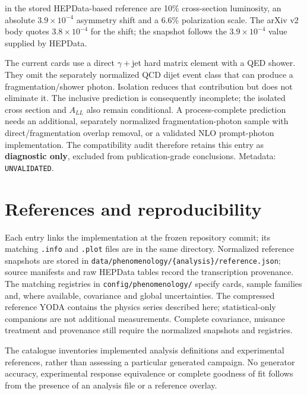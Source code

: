 \documentclass[11pt,a4paper]{article}
\begin{document}
\begin{description}
in the stored HEPData-based reference are 10\% cross-section luminosity,
an absolute $3.9\times10^{-4}$ asymmetry shift and a 6.6\% polarization scale.
The arXiv v2 body quotes $3.8\times10^{-4}$ for the shift; the snapshot follows
the $3.9\times10^{-4}$ value supplied by HEPData.
\item[Coverage and limitations.]
The current cards use a direct $\gamma+$jet hard matrix element with a QED
shower. They omit the separately normalized QCD dijet event class that can
produce a fragmentation/shower photon. Isolation reduces that contribution
but does not eliminate it. The inclusive prediction is consequently
incomplete; the isolated cross section and $A_{LL}$ also remain conditional.
A process-complete prediction needs an additional, separately normalized
fragmentation-photon sample with direct/fragmentation overlap removal, or a
validated NLO prompt-photon implementation. The compatibility
audit therefore retains this entry as \textbf{diagnostic only}, excluded from
publication-grade conclusions. Metadata: \texttt{UNVALIDATED}.
\end{description}
\clearpage

\section*{References and reproducibility}
Each entry links the implementation at the frozen repository commit; its
matching \texttt{.info} and \texttt{.plot} files are in the same directory.
Normalized reference snapshots are stored in
\texttt{data/phenomenology/\{analysis\}/reference.json}; source manifests and
raw HEPData tables record the transcription provenance. The matching registries
in \texttt{config/phenomenology/} specify cards, sample families and, where
available, covariance and global uncertainties. The compressed reference YODA
contains the physics series described here; statistical-only companions are
not additional measurements. Complete covariance, nuisance treatment and
provenance still require the normalized snapshots and registries.

The catalogue inventories implemented analysis definitions and experimental
references, rather than assessing a particular generated campaign. No
generator accuracy, experimental response equivalence or complete goodness
of fit follows from the presence of an analysis file or a reference overlay.
\end{document}
